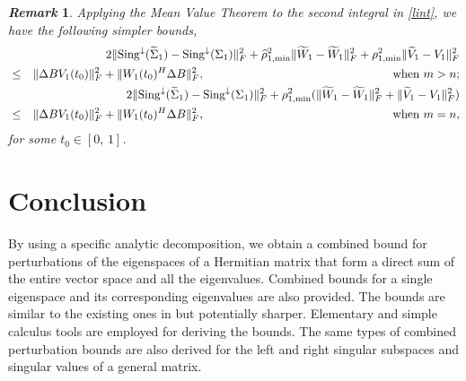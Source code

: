 \documentclass[11pt,a4paper]{article}
\numberwithin{equation}{section}
\newcommand {\bstar}  {\begin{eqnarray*}}
\newcommand {\estar} {\end{eqnarray*}}
\newtheorem{Remark}{{\it Remark}}[section]
\newcommand {\wh} {\widehat}
\newcommand {\wt} {\widetilde}
\begin{document}
\begin{Remark}\label{rem361}
Applying the Mean Value Theorem to the second integral in \eqref{lint}, we have the following
simpler bounds,
\bstar
&& 2\|{\rm Sing}^{\downarrow}(\wt\Sigma_1)-{\rm Sing}^{\downarrow}(\Sigma_1)\|_F^2+\wh \rho_{1,\min}^2\|{\wt W_1-\wt W_1}\|_F^2+
\rho_{1,\min}^2\|{\wt V_1-V_1}\|_F^2\\
&\le&\|{\Delta BV_1(t_0)}\|_F^2+\|{W_1(t_0)^H\Delta B}\|_F^2,\qquad\qquad\qquad\qquad\qquad\qquad\qquad\quad\quad\mbox{when } m>n;\\
&& 2\|{\rm Sing}^{\downarrow}(\wt\Sigma_1)-{\rm Sing}^{\downarrow}(\Sigma_1)\|_F^2+ \rho_{1,\min}^2(\|{\wt W_1-\wt W_1}\|_F^2+
\|{\wt V_1-V_1}\|_F^2)\\
&\le&\|{\Delta BV_1(t_0)}\|_F^2+\|{W_1(t_0)^H\Delta B}\|_F^2,\qquad\qquad\qquad\qquad\qquad\qquad\qquad\quad\quad\mbox{when } m=n,
\estar
for some $t_0\in [0,\,1]$.
\end{Remark}

\medskip

\section{Conclusion}
By using a specific analytic decomposition, we obtain a combined bound for perturbations of the  eigenspaces of a Hermitian matrix that form a direct sum of the entire vector space
and all the eigenvalues. Combined bounds for a single eigenspace and its corresponding eigenvalues are also provided. The bounds are similar to the existing ones
in \cite{li07} but potentially sharper.   Elementary and simple calculus tools are employed for deriving the bounds. The same types of combined perturbation bounds are also derived for the left and right singular subspaces and singular values of a general matrix.

\end{document}
